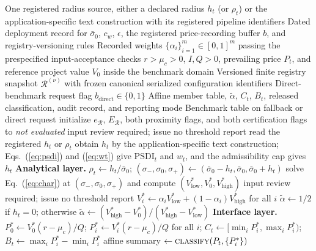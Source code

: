 \documentclass[5p,times,authoryear]{elsarticle}
\theoremstyle{plain}
\newcommand{\sbar}{\bar{\sigma}_0}
\newcommand{\Vlow}{V^{*}_{\mathrm{low}}}
\newcommand{\Vhigh}{V^{*}_{\mathrm{high}}}
\newcommand{\Vzero}{V^{*}_{0}}
\newcommand{\ER}{E_{\mathcal{R}}}
\newcommand{\eR}{e_{\mathcal{R}}}
\newcommand{\PSDI}{\mathrm{PSDI}}
\begin{document}
\begin{algorithm*}[!t]
\caption{Gate-level member thresholds and safeguarded classification.}
\label{alg:gate}
\footnotesize
\begin{algorithmic}[1]
\Require One registered radius source, either a declared radius $h_t$ (or $\rho_t$) or the application-specific text construction with its registered pipeline identifiers
\Require Dated deployment record for $\sbar$, $c_w$, $\epsilon$, the registered price-recording buffer $b$, and registry-versioning rules
\Require Recorded weights $\{\alpha_i\}_{i=1}^{m}\in[0,1]^{m}$ passing the prespecified input-acceptance checks 
\Require $r>\mu_c>0$, $I,Q>0$, prevailing price $P_t$, and reference project value $V_0$ inside the benchmark domain
\Require Versioned finite registry snapshot $\mathcal{R}^{(\nu)}$ with frozen canonical serialized configuration identifiers
\Require Direct-benchmark request flag $b_{\mathrm{direct}}\in\{0,1\}$
\Ensure Affine member table, $\tilde{\alpha}$, $C_t$, $B_t$, released classification, audit record, and reporting mode
\Ensure Benchmark table on fallback or direct request
\State initialize $\eR$, $\ER$, both proximity flags, and both certification flags to \emph{not evaluated} 
  \State \Return input review required; issue no threshold report
\EndIf
{}
  \State read the registered $h_t$ or $\rho_t$
\Else
  \State obtain $h_t$ by the application-specific text construction; Eqs.~(\ref{eq:psdi}) and (\ref{eq:wt}) give $\PSDI_t$ and $w_t$, and the admissibility cap gives $h_t$ 
\EndIf
\State \textbf{Analytical layer.} $\rho_t\gets h_t/\sbar$; $(\sigma_{-},\sigma_0,\sigma_{+})\gets(\sbar-h_t,\sbar,\sbar+h_t)$
\State solve Eq.~(\ref{eq:char}) at $(\sigma_{-},\sigma_0,\sigma_{+})$ and compute $(\Vlow,\Vzero,\Vhigh)$
\If{$V_0\ge\Vlow$}
  \State \Return input review required; issue no threshold report 
\EndIf
\State $V^{*}_{i}\gets\alpha_i\Vlow+(1-\alpha_i)\Vhigh$ for all $i$
\State $\tilde{\alpha}\gets1/2$ if $h_t=0$; otherwise $\tilde{\alpha}\gets(\Vhigh-\Vzero)/(\Vhigh-\Vlow)$
\State \textbf{Interface layer.} $P^{*}_{0}\gets\Vzero(r-\mu_c)/Q$; $P^{*}_{i}\gets V^{*}_{i}(r-\mu_c)/Q$ for all $i$; $C_t\gets[\min_iP^{*}_{i},\max_iP^{*}_{i})$; $B_t\gets\max_iP^{*}_{i}-\min_iP^{*}_{i}$
\State affine summary $\gets\textsc{classify}(P_t,\{P^{*}_{i}\})$ 

\end{algorithmic}
\end{algorithm*}
\end{document}
